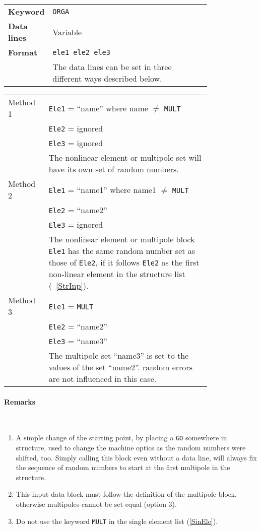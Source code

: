 \bigskip
\begin{tabular}{@{}lp{0.8\linewidth}}
    \textbf{Keyword}    & \texttt{ORGA} \\
    \textbf{Data lines} & Variable \\
    \textbf{Format}     & \texttt{ele1 ele2 ele3} \\
                        & The data lines can be set in three different ways described below.
\end{tabular}

\bigskip
\begin{longtabu}{@{}lp{0.8\linewidth}}
    Method 1 & \texttt{Ele1} = ``name'' where name $\ne$ \texttt{MULT} \\
             & \texttt{Ele2} = ignored  \\
             & \texttt{Ele3} = ignored  \\
             & The nonlinear element or multipole set will have its own set of random numbers. \\
    Method 2 & \texttt{Ele1} = ``name1'' where name1 $\ne$ \texttt{MULT} \\
             & \texttt{Ele2} = ``name2'' \\
             & \texttt{Ele3} = ignored \\
             & The nonlinear element or multipole block \texttt{Ele1} has the same random number set as those of \texttt{Ele2}, if it follows \texttt{Ele2} as the first non-linear element in the structure list (~\ref{StrInp}). \\
    Method 3 & \texttt{Ele1} = \texttt{MULT} \\
             & \texttt{Ele2} = ``name2'' \\
             & \texttt{Ele3} = ``name3'' \\
             & The multipole set ``name3'' is set to the values of the set ``name2''. random errors are not influenced in this case.
\end{longtabu}

\paragraph{Remarks}~

\begin{enumerate}
    \item A simple change of the starting point, by placing a \texttt{GO} somewhere in structure, used to change the machine optics as the random numbers were shifted, too. Simply calling this block even without a data line, will always fix the sequence of random numbers to start at the first multipole in the structure.
    \item This input data block must follow the definition of the multipole block, otherwise multipoles cannot be set equal (option 3).
    \item Do not use the keyword \texttt{MULT} in the single element list (\ref{SinEle}).
\end{enumerate}

